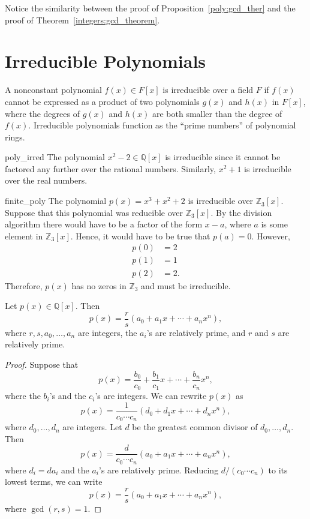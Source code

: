  
\medskip
 
 
Notice the similarity between the proof of Proposition~\ref{poly:gcd_ther} and the 
proof of Theorem~\ref{integers:gcd_theorem}.
 
 
 
\section{Irreducible Polynomials}
 
 
A nonconstant polynomial $f(x) \in F[x]$ is {\bfi
irreducible\/}
over a field $F$ if $f(x)$ cannot be expressed as a product of two
polynomials $g(x)$ and $h(x)$ in $F[x]$, where the degrees of $g(x)$
and $h(x)$ are both smaller than the degree of $f(x)$.  Irreducible
polynomials function as the ``prime numbers'' of polynomial rings.
 
 
\begin{example}{poly_irred}
The polynomial $x^2 - 2 \in {\mathbb Q}[x]$ is irreducible since it
cannot be factored any further over the rational numbers. Similarly,
$x^2 + 1$ is  irreducible over the real numbers. 
\end{example}
 
 
\begin{example}{finite_poly}
The polynomial $p(x) = x^3 + x^2 + 2$ is irreducible over ${\mathbb
Z}_3[x]$. Suppose that this polynomial was reducible over ${\mathbb
Z}_3[x]$.  By the division algorithm there would have to be a factor
of the form $x - a$, where $a$ is some element in ${\mathbb Z}_3[x]$.
Hence, it would have to be true that $p(a) = 0$.  However,
\begin{align*}
p(0) & = 2 \\
p(1) & = 1 \\
p(2) & = 2.
\end{align*}
Therefore, $p(x)$ has no zeros in ${\mathbb Z}_3$ and must be
irreducible. 
\end{example}
 
 
\begin{lemma}\label{poly:integer_coef_lemma}
Let $p(x) \in {\mathbb Q}[x]$.  Then
\[
p(x) = \frac{r}{s}(a_0 + a_1 x + \cdots + a_n x^n),
\]
where $r, s, a_0, \ldots, a_n$ are integers, the $a_i$'s are
relatively prime, and $r$ and $s$ are relatively prime. 
\end{lemma}
 
 
\begin{proof}
Suppose that
\[
p(x) = \frac{b_0}{c_0} + \frac{b_1}{c_1} x + \cdots + \frac{b_n}{c_n}
x^n,
\]
where the $b_i$'s and the $c_i$'s are integers. We can rewrite $p(x)$
as 
\[
p(x) = \frac{1}{c_0 \cdots c_n} (d_0 + d_1 x + \cdots + d_n x^n),
\]
where $d_0, \ldots, d_n$ are integers. Let $d$ be the greatest common
divisor of $d_0, \ldots, d_n$.  Then
\[
p(x) = \frac{d}{c_0 \cdots c_n} (a_0 + a_1 x + \cdots + a_n x^n),
\]
where $d_i = d a_i$ and the $a_i$'s are relatively prime. Reducing $d
/(c_0 \cdots c_n)$ to its lowest terms, we can write
\[
p(x) = \frac{r}{s}(a_0 + a_1 x + \cdots + a_n x^n), 
\]
where $\gcd(r,s) = 1$.
\end{proof}
 
